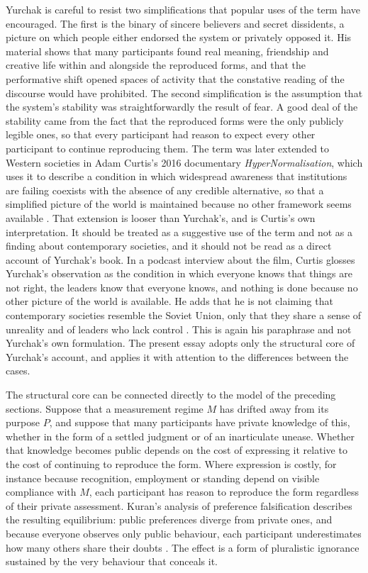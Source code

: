 \documentclass[11pt]{article}
\theoremstyle{definition}
\theoremstyle{remark}
\begin{document}
Yurchak is careful to resist two simplifications that popular uses of the term have encouraged. The first is the binary of sincere believers and secret dissidents, a picture on which people either endorsed the system or privately opposed it. His material shows that many participants found real meaning, friendship and creative life within and alongside the reproduced forms, and that the performative shift opened spaces of activity that the constative reading of the discourse would have prohibited. The second simplification is the assumption that the system's stability was straightforwardly the result of fear. A good deal of the stability came from the fact that the reproduced forms were the only publicly legible ones, so that every participant had reason to expect every other participant to continue reproducing them. The term was later extended to Western societies in Adam Curtis's 2016 documentary \emph{HyperNormalisation}, which uses it to describe a condition in which widespread awareness that institutions are failing coexists with the absence of any credible alternative, so that a simplified picture of the world is maintained because no other framework seems available \cite{curtis2016}. That extension is looser than Yurchak's, and is Curtis's own interpretation. It should be treated as a suggestive use of the term and not as a finding about contemporary societies, and it should not be read as a direct account of Yurchak's book. In a podcast interview about the film, Curtis glosses Yurchak's observation as the condition in which everyone knows that things are not right, the leaders know that everyone knows, and nothing is done because no other picture of the world is available. He adds that he is not claiming that contemporary societies resemble the Soviet Union, only that they share a sense of unreality and of leaders who lack control \cite{brandcurtis2016}. This is again his paraphrase and not Yurchak's own formulation. The present essay adopts only the structural core of Yurchak's account, and applies it with attention to the differences between the cases.

The structural core can be connected directly to the model of the preceding sections. Suppose that a measurement regime $M$ has drifted away from its purpose $P$, and suppose that many participants have private knowledge of this, whether in the form of a settled judgment or of an inarticulate unease. Whether that knowledge becomes public depends on the cost of expressing it relative to the cost of continuing to reproduce the form. Where expression is costly, for instance because recognition, employment or standing depend on visible compliance with $M$, each participant has reason to reproduce the form regardless of their private assessment. Kuran's analysis of preference falsification describes the resulting equilibrium: public preferences diverge from private ones, and because everyone observes only public behaviour, each participant underestimates how many others share their doubts \cite{kuran1995}. The effect is a form of pluralistic ignorance sustained by the very behaviour that conceals it.
\end{document}
